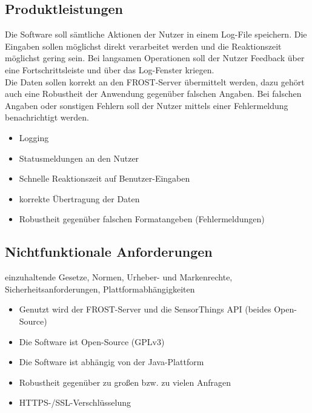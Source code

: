 \documentclass[12 pt]{article}
\begin{document}
\subsection{Produktleistungen}
Die Software soll sämtliche Aktionen der Nutzer in einem Log-File speichern. Die Eingaben sollen möglichst direkt verarbeitet werden und die Reaktionszeit möglichst gering sein. Bei langsamen Operationen soll der Nutzer Feedback über eine Fortschrittsleiste und über das Log-Fenster kriegen. \\
Die Daten sollen korrekt an den FROST-Server übermittelt werden, dazu gehört auch eine Robustheit der Anwendung gegenüber falschen Angaben. Bei falschen Angaben oder sonstigen Fehlern soll der Nutzer mittels einer Fehlermeldung benachrichtigt werden.
\begin{itemize}
\item Logging
\item Statusmeldungen an den Nutzer
\item Schnelle Reaktionszeit auf Benutzer-Eingaben
\item korrekte Übertragung der Daten
\item Robustheit gegenüber falschen Formatangeben (Fehlermeldungen)
\end{itemize}

\subsection{Nichtfunktionale Anforderungen}
einzuhaltende Gesetze, Normen, Urheber- und Markenrechte,
Sicherheitsanforderungen, Plattformabhängigkeiten
\begin{itemize}
\item Genutzt wird der FROST-Server und die SensorThings API (beides Open-Source)
\item Die Software ist Open-Source (GPLv3)
\item Die Software ist abhängig von der Java-Plattform
\item Robustheit gegenüber zu großen bzw. zu vielen Anfragen
\item HTTPS-/SSL-Verschlüsselung
\end{itemize}
\end{document}
